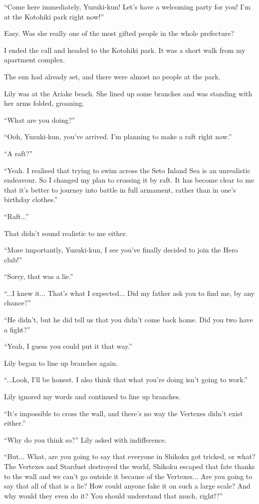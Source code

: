 ``Come here immediately, Yuzuki-kun! Let's have a welcoming party for you! I'm at the Kotohiki park right now!''

Easy. Was she really one of the most gifted people in the whole prefecture?

I ended the call and headed to the Kotohiki park. It was a short walk from my apartment complex.

The sun had already set, and there were almost no people at the park.

Lily was at the Ariake beach. She lined up some branches and was standing with her arms folded, groaning.

``What are you doing?''

``Ooh, Yuzuki-kun, you've arrived. I'm planning to make a raft right now.''

``A raft?''

``Yeah. I realised that trying to swim across the Seto Inland Sea is an unrealistic endeavour. So I changed my plan to crossing it by raft. It has become clear to me that it's better to journey into battle in full armament, rather than in one's birthday clothes.''

``Raft...''

That didn't sound realistic to me either.

``More importantly, Yuzuki-kun, I see you've finally decided to join the Hero club!''

``Sorry, that was a lie.''

``...I knew it... That's what I expected... Did my father ask you to find me, by any chance?''

``He didn't, but he did tell us that you didn't come back home. Did you two have a fight?''

``Yeah, I guess you could put it that way.''

Lily began to line up branches again.

``...Look, I'll be honest. I also think that what you're doing isn't going to work.''

Lily ignored my words and continued to line up branches.

``It's impossible to cross the wall, and there's no way the Vertexes didn't exist either.''

``Why do you think so?'' Lily asked with indifference.

``But... What, are you going to say that everyone in Shikoku got tricked, or what? The Vertexes and Stardust destroyed the world, Shikoku escaped that fate thanks to the wall and we can't go outside it because of the Vertexes... Are you going to say that all of that is a lie? How could anyone fake it on such a large scale? And why would they even do it? You should understand that much, right!?''

